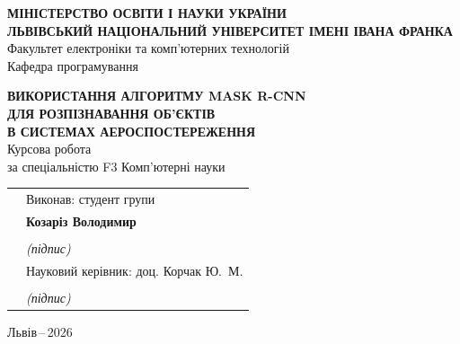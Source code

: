 \documentclass[14pt,a4paper]{extreport}
\begin{document}
\setcounter{page}{1}

\begin{titlepage}
\thispagestyle{empty}
\begin{center}
\textbf{МІНІСТЕРСТВО ОСВІТИ І НАУКИ УКРАЇНИ}\\[4pt]
\textbf{ЛЬВІВСЬКИЙ НАЦІОНАЛЬНИЙ УНІВЕРСИТЕТ ІМЕНІ ІВАНА ФРАНКА}\\[4pt]
Факультет електроніки та комп'ютерних технологій\\[4pt]
Кафедра програмування
\end{center}

\vspace{10mm}
\begin{center}
\textbf{ВИКОРИСТАННЯ АЛГОРИТМУ MASK R-CNN\\
ДЛЯ РОЗПІЗНАВАННЯ ОБ'ЄКТІВ\\
В СИСТЕМАХ АЕРОСПОСТЕРЕЖЕННЯ}\\[6pt]
Курсова робота\\
за спеціальністю F3 Комп'ютерні науки
\end{center}

\vspace{6mm}
\noindent
\begin{tabular}{@{}p{}p{}@{}}
 & Виконав: студент \underline{\hspace{1.5cm}} групи \\[4pt]
 & \textbf{Козаріз Володимир} \\[4pt]
 & \underline{\hspace{5.5cm}} \\[2pt]
 & \hspace{1.5cm}\textit{(підпис)} \\[12pt]
 & Науковий керівник: доц. Корчак Ю.~М. \\[4pt]
 & \underline{\hspace{5.5cm}} \\[2pt]
 & \hspace{1.5cm}\textit{(підпис)} \\
\end{tabular}

\vfill
\begin{center}
Львів\,--\,2026
\end{center}
\end{titlepage}
\end{document}
